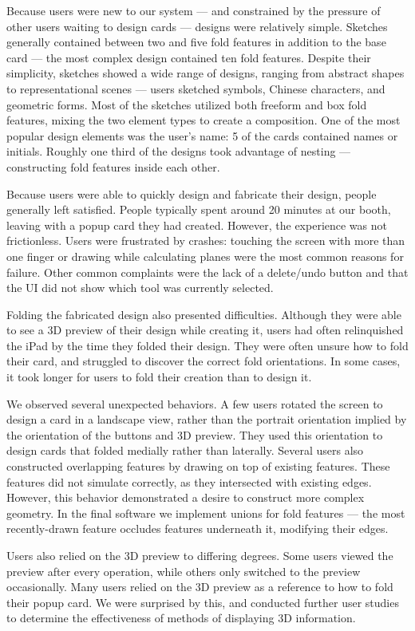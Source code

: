 Because users were new to our system --- and constrained by the pressure
of other users waiting to design cards --- designs were relatively
simple. Sketches generally contained between two and five fold features
in addition to the base card --- the most complex design contained ten
fold features. Despite their simplicity, sketches showed a wide range of
designs, ranging from abstract shapes to representational scenes ---
users sketched symbols, Chinese characters, and geometric forms. Most of
the sketches utilized both freeform and box fold features, mixing the
two element types to create a composition. One of the most popular
design elements was the user's name: 5 of the cards contained names or
initials. Roughly one third of the designs took advantage of nesting ---
constructing fold features inside each other.

Because users were able to quickly design and fabricate their design,
people generally left satisfied. People typically spent around 20
minutes at our booth, leaving with a popup card they had created.
However, the experience was not frictionless. Users were frustrated by
crashes: touching the screen with more than one finger or drawing while
calculating planes were the most common reasons for failure. Other
common complaints were the lack of a delete/undo button and that the UI
did not show which tool was currently selected.

Folding the fabricated design also presented difficulties. Although they
were able to see a 3D preview of their design while creating it, users
had often relinquished the iPad by the time they folded their design.
They were often unsure how to fold their card, and struggled to discover
the correct fold orientations. In some cases, it took longer for users
to fold their creation than to design it.

We observed several unexpected behaviors. A few users rotated the screen
to design a card in a landscape view, rather than the portrait
orientation implied by the orientation of the buttons and 3D preview.
They used this orientation to design cards that folded medially rather
than laterally. Several users also constructed overlapping features by
drawing on top of existing features. These features did not simulate
correctly, as they intersected with existing edges. However, this
behavior demonstrated a desire to construct more complex geometry. In
the final software we implement unions for fold features --- the most
recently-drawn feature occludes features underneath it, modifying their
edges.

Users also relied on the 3D preview to differing degrees. Some users
viewed the preview after every operation, while others only switched to
the preview occasionally. Many users relied on the 3D preview as a
reference to how to fold their popup card. We were surprised by this,
and conducted further user studies to determine the effectiveness of
methods of displaying 3D information.
